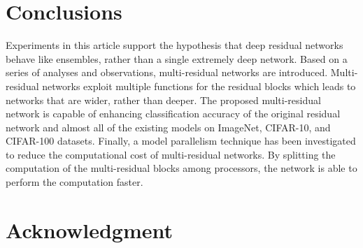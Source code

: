 \documentclass[journal]{IEEEtran}
\begin{document}
\section{Conclusions}\label{sec6}

Experiments in this article support the hypothesis that deep residual networks behave like ensembles, rather than a single extremely deep network. Based on a series of analyses and observations, multi-residual networks are introduced. Multi-residual networks exploit multiple functions for the residual blocks which leads to networks that are wider, rather than deeper. The proposed multi-residual network is capable of enhancing classification accuracy of the original residual network and almost all of the existing models on ImageNet, CIFAR-10, and CIFAR-100 datasets. Finally, a model parallelism technique has been investigated to reduce the computational cost of multi-residual networks. By splitting the computation of the multi-residual blocks among processors, the network is able to perform the computation faster.







%



\section*{Acknowledgment}
\end{document}
